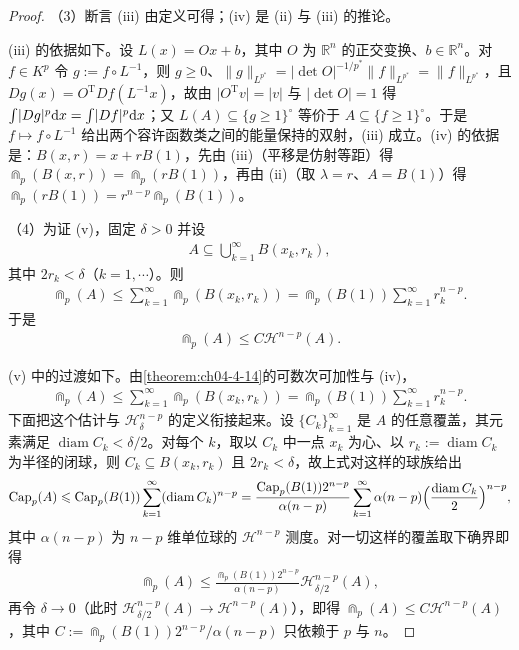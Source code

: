\documentclass[../../main.tex]{subfiles}%
\begin{document}
\begin{proof}
（3）断言 (iii) 由定义可得；(iv) 是 (ii) 与 (iii) 的推论。

(iii) 的依据如下。设 $L(x)=Ox+b$，其中 $O$ 为 $\mathbb{R}^n$ 的正交变换、$b\in\mathbb{R}^n$。对 $f\in K^p$ 令 $g:=f\circ L^{-1}$，则 $g\geqslant0$、$\lVert g\rVert_{L^{p^*}}=\lvert\det O\rvert^{-1/p^*}\lVert f\rVert_{L^{p^*}}=\lVert f\rVert_{L^{p^*}}$，且 $Dg(x)=O^{\mathrm{T}}Df(L^{-1}x)$，故由 $\lvert O^{\mathrm{T}}v\rvert=\lvert v\rvert$ 与 $\lvert\det O\rvert=1$ 得 $\int\lvert Dg\rvert^p\diff x=\int\lvert Df\rvert^p\diff x$；又 $L(A)\subseteq\{g\geqslant1\}^{\circ}$ 等价于 $A\subseteq\{f\geqslant1\}^{\circ}$。于是 $f\mapsto f\circ L^{-1}$ 给出两个容许函数类之间的能量保持的双射，(iii) 成立。(iv) 的依据是：$B(x,r)=x+rB(1)$，先由 (iii)（平移是仿射等距）得 $\Cap_p(B(x,r))=\Cap_p(rB(1))$，再由 (ii)（取 $\lambda=r$、$A=B(1)$）得 $\Cap_p(rB(1))=r^{n-p}\Cap_p(B(1))$。

（4）为证 (v)，固定 $\delta>0$ 并设
\begin{align*}
A\subseteq\bigcup_{k=1}^{\infty}B(x_k,r_k),
\end{align*}
其中 $2r_k<\delta$（$k=1,\cdots$）。则
\begin{align*}
\Cap_p(A)\leqslant\sum_{k=1}^{\infty}\Cap_p(B(x_k,r_k))=\Cap_p(B(1))\sum_{k=1}^{\infty}r_k^{n-p}.
\end{align*}
于是
\begin{align*}
\Cap_p(A)\leqslant C\mathcal{H}^{n-p}(A).
\end{align*}

(v) 中的过渡如下。由\cref{theorem:ch04-4-14}的可数次可加性与 (iv)，%
\begin{align*}
\Cap_p(A)\leqslant\sum_{k=1}^{\infty}\Cap_p(B(x_k,r_k))=\Cap_p(B(1))\sum_{k=1}^{\infty}r_k^{n-p}.
\end{align*}
下面把这个估计与 $\mathcal{H}^{n-p}_\delta$ 的定义衔接起来。设 $\{C_k\}_{k=1}^{\infty}$ 是 $A$ 的任意覆盖，其元素满足 $\operatorname{diam}C_k<\delta/2$。对每个 $k$，取以 $C_k$ 中一点 $x_k$ 为心、以 $r_k:=\operatorname{diam}C_k$ 为半径的闭球，则 $C_k\subseteq B(x_k,r_k)$ 且 $2r_k<\delta$，故上式对这样的球族给出
\begin{align*}
\Cap_p(A)\leqslant\Cap_p(B(1))\sum_{k=1}^{\infty}(\operatorname{diam}C_k)^{n-p}=\frac{\Cap_p(B(1))2^{n-p}}{\alpha(n-p)}\sum_{k=1}^{\infty}\alpha(n-p)\Bigl(\frac{\operatorname{diam}C_k}{2}\Bigr)^{n-p},
\end{align*}
其中 $\alpha(n-p)$ 为 $n-p$ 维单位球的 $\mathcal{H}^{n-p}$ 测度。对一切这样的覆盖取下确界即得
\begin{align*}
\Cap_p(A)\leqslant\frac{\Cap_p(B(1))2^{n-p}}{\alpha(n-p)}\mathcal{H}^{n-p}_{\delta/2}(A),
\end{align*}
再令 $\delta\to0$（此时 $\mathcal{H}^{n-p}_{\delta/2}(A)\to\mathcal{H}^{n-p}(A)$），即得 $\Cap_p(A)\leqslant C\mathcal{H}^{n-p}(A)$，其中 $C:=\Cap_p(B(1))2^{n-p}/\alpha(n-p)$ 只依赖于 $p$ 与 $n$。


\end{proof}
\end{document}

